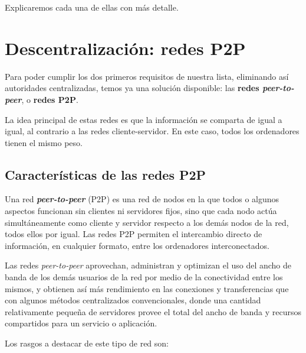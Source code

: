 \documentclass[10pt, a4paper]{article}
\theoremstyle{theorem-style}
\theoremstyle{theorem-style}
\theoremstyle{definition-style}
\theoremstyle{remark-style}
\theoremstyle{example-style}
\theoremstyle{definition-style}
\theoremstyle{remark-style}
\begin{document}
Explicaremos cada una de ellas con más detalle.

\section{Descentralización: redes
P2P}\label{compartiendo-informaciuxf3n-de-forma-descentralizada-redes-p2p}

Para poder cumplir los dos primeros requisitos de nuestra lista,
eliminando así autoridades centralizadas, temos ya una solución
disponible: las \textbf{redes \emph{peer-to-peer}}, o \textbf{redes
P2P}.

La idea principal de estas redes es que la información se comparta de
igual a igual, al contrario a las redes cliente-servidor. En este caso,
todos los ordenadores tienen el mismo peso.

\subsection{Características de las redes P2P}

Una red \textbf{\emph{peer-to-peer}} (P2P) es una red de nodos en la que todos o algunos aspectos funcionan sin clientes ni servidores fijos, sino que cada nodo actúa simultáneamente como cliente y servidor respecto a los demás nodos de la red, todos ellos por igual. Las redes P2P permiten el intercambio directo de información, en cualquier formato, entre los ordenadores interconectados.

Las redes \emph{peer-to-peer} aprovechan, administran y optimizan el uso del ancho de banda de los demás usuarios de la red por medio de la conectividad entre los mismos, y obtienen así más rendimiento en las conexiones y transferencias que con algunos métodos centralizados convencionales, donde una cantidad relativamente pequeña de servidores provee el total del ancho de banda y recursos compartidos para un servicio o aplicación.

Los rasgos a destacar de este tipo de red son:
\end{document}
